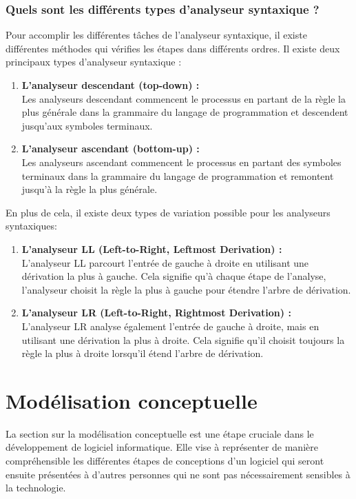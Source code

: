 \documentclass{rapport}
\begin{document}
\newpage
\subsubsection{Quels sont les différents types d'analyseur syntaxique ?}
Pour accomplir les différentes tâches de l'analyseur syntaxique, il existe différentes méthodes qui vérifies les étapes dans différents ordres. Il existe deux principaux types d'analyseur syntaxique :
\begin{enumerate}
    \item \textbf{L'analyseur descendant (top-down) :}\\
    Les analyseurs descendant commencent le processus en partant de la règle la plus générale dans la grammaire du langage de programmation et descendent jusqu'aux symboles terminaux.
    \item \textbf{L'analyseur ascendant (bottom-up) :}\\
    Les analyseurs ascendant commencent le processus en partant des symboles terminaux dans la grammaire du langage de programmation et remontent jusqu'à la règle la plus générale.
\end{enumerate}

En plus de cela, il existe deux types de variation possible pour les analyseurs syntaxiques:
\begin{enumerate}
    \item \textbf{L'analyseur LL (Left-to-Right, Leftmost Derivation) :}\\
    L'analyseur LL parcourt l'entrée de gauche à droite en utilisant une dérivation la plus à gauche. Cela signifie qu'à chaque étape de l'analyse, l'analyseur choisit la règle la plus à gauche pour étendre l'arbre de dérivation.
    \item \textbf{L'analyseur LR (Left-to-Right, Rightmost Derivation) :}\\
     L'analyseur LR analyse également l'entrée de gauche à droite, mais en utilisant une dérivation la plus à droite. Cela signifie qu'il choisit toujours la règle la plus à droite lorsqu'il étend l'arbre de dérivation.
\end{enumerate}
\newpage
\section{Modélisation conceptuelle}
\label{concept}
La section sur la modélisation conceptuelle est une étape cruciale dans le développement de logiciel informatique. Elle vise à représenter de manière compréhensible les différentes étapes de conceptions d'un logiciel qui seront ensuite présentées à d'autres personnes qui ne sont pas nécessairement sensibles à la technologie. 
\end{document}
